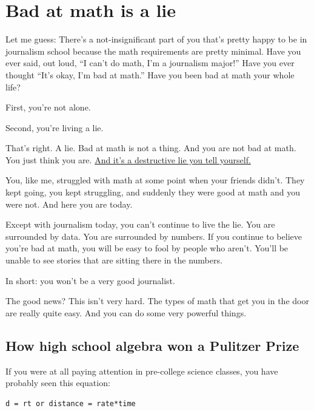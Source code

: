 \documentclass[]{book}
\begin{document}
\hypertarget{bad-at-math-is-a-lie}{%
\chapter{Bad at math is a lie}\label{bad-at-math-is-a-lie}}

Let me guess: There's a not-insignificant part of you that's pretty happy to be in journalism school because the math requirements are pretty minimal. Have you ever said, out loud, ``I can't do math, I'm a journalism major!'' Have you ever thought ``It's okay, I'm bad at math.'' Have you been bad at math your whole life?

First, you're not alone.

Second, you're living a lie.

That's right. A lie. Bad at math is not a thing. And you are not bad at math. You just think you are. \href{http://www.niemanlab.org/2013/11/matt-waite-how-i-faced-my-fears-and-learned-to-be-good-at-math/}{And it's a destructive lie you tell yourself.}

You, like me, struggled with math at some point when your friends didn't. They kept going, you kept struggling, and suddenly they were good at math and you were not. And here you are today.

Except with journalism today, you can't continue to live the lie. You are surrounded by data. You are surrounded by numbers. If you continue to believe you're bad at math, you will be easy to fool by people who aren't. You'll be unable to see stories that are sitting there in the numbers.

In short: you won't be a very good journalist.

The good news? This isn't very hard. The types of math that get you in the door are really quite easy. And you can do some very powerful things.

\hypertarget{how-high-school-algebra-won-a-pulitzer-prize}{%
\section{How high school algebra won a Pulitzer Prize}\label{how-high-school-algebra-won-a-pulitzer-prize}}

If you were at all paying attention in pre-college science classes, you have probably seen this equation:

\begin{verbatim}
d = rt or distance = rate*time
\end{verbatim}
\end{document}
